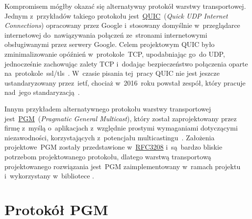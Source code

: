 \documentclass[thesis]{subfiles}
\begin{document}
Kompromisem mógłby okazać się alternatywny protokół warstwy transportowej. Jednym z~przykładów takiego protokołu jest~\href{https://en.wikipedia.org/wiki/QUIC}{QUIC}~(\emph{Quick UDP Internet Connections}) opracowany przez Google i~stosowany domyślnie w~przeglądarce internetowej  do~nawiązywania połączeń ze~stronami internetowymi obsługiwanymi przez serwery Google. Celem projektowym QUIC było zminimalizowanie opóźnień w~protokole~TCP, upodabniając go~do UDP, jednocześnie zachowując zalety TCP i~dodając bezpieczeństwo połączenia oparte na~protokole~\gls{ssl/tls}~\cite{quic-wire-layout-spec,quic-crypto,quic-roskind}. W~czasie pisania tej~pracy QUIC nie jest jeszcze ustandaryzowany przez~\gls{ietf}, chociaż w~2016~roku powstał zespół, który pracuje nad~jego standaryzacją~\cite{quic-draft,quic-workinggroup}.

Innym przykładem alternatywnego protokołu warstwy transportowej jest~\href{https://en.wikipedia.org/wiki/Pragmatic_General_Multicast}{PGM}~(\emph{Pragmatic General Multicast}), który został zaprojektowany przez firmę  z~myślą o~aplikacjach z~względnie prostymi wymaganiami dotyczącymi niezawodności, korzystających z~potencjału multicastingu~\cite{pgm-rfc}. Założenia projektowe~PGM zostały przedstawione w~\href{https://tools.ietf.org/html/rfc3208}{RFC3208} i~są~bardzo bliskie potrzebom projektowanego protokołu, dlatego warstwą transportową projektowanego rozwiązania jest~PGM zaimplementowany w~ramach projektu  i~wykorzystany w~bibliotece . %

%


\section{Protokół PGM}
\end{document}
